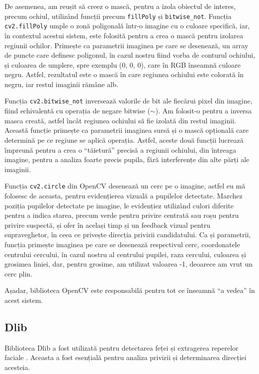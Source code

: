 \documentclass[12pt,a4paper]{article}
\begin{document}
De asemenea, am reușit să creez o mască, pentru a izola obiectul de
interes, precum ochiul, utilizând funcții precum \texttt{fillPoly} și
\texttt{bitwise\_not}. Funcția \texttt{cv2.fillPoly} umple o zonă poligonală într-o imagine
cu o culoare specifică, iar, în contextul acestui sistem, este folosită
pentru a crea o mască pentru izolarea regiunii ochilor. Primește ca
parametrii imaginea pe care se desenează, un array de puncte care
definesc poligonul, în cazul nostru fiind vorba de conturul ochiului, și
culoarea de umplere, spre exemplu (0, 0, 0), care în RGB înseamnă
culoare negru. Astfel, rezultatul este o mască în care regiunea ochiului
este colorată în negru, iar restul imaginii rămâne alb.

Funcția \texttt{cv2.bitwise\_not} inversează valorile de bit ale fiecărui pixel
din imagine, fiind echivalentă cu operația de negare bitwise ($\sim$). Am
folosit-o pentru a inversa masca creată, astfel încât regiunea ochiului
să fie izolată din restul imaginii. Această funcție primește ca
parametrii imaginea sursă și o mască opțională care determină pe ce
regiune se aplică operația. Astfel, aceste două funcții lucrează
împreună pentru a crea o ``tăietură'' precisă a regiunii ochiului, din
întreaga imagine, pentru a analiza foarte precis pupila, fără
interferențe din alte părți ale imaginii.

Funcția \texttt{cv2.circle} din OpenCV desenează un cerc pe o imagine, astfel eu
mă folosesc de aceasta, pentru evidențierea vizuală a pupilelor
detectate. Marchez poziția pupilelor detectate pe imagine, le evidențiez
utilizând culori diferite pentru a indica starea, precum verde pentru
privire centrată sau roșu pentru privire suspectă, și ofer în același
timp și un feedback vizual pentru supraveghetor, în ceea ce privește
direcția privirii candidatului. Ca și parametrii, funcția primește
imaginea pe care se desenează respectivul cerc, coordonatele centrului
cercului, în cazul nostru al centrului pupilei, raza cercului, culoarea
și grosimea liniei, dar, pentru grosime, am utilizat valoarea -1,
deoarece am vrut un cerc plin.

Așadar, biblioteca OpenCV este responsabilă pentru tot ce înseamnă ``a
vedea'' în acest sistem.

\subsection{Dlib}
\hspace{6mm}Biblioteca Dlib a fost utilizată pentru detectarea feței și extragerea reperelor faciale \cite{dlib}. Aceasta a fost esențială pentru analiza privirii și determinarea direcției acesteia. 
\end{document}

